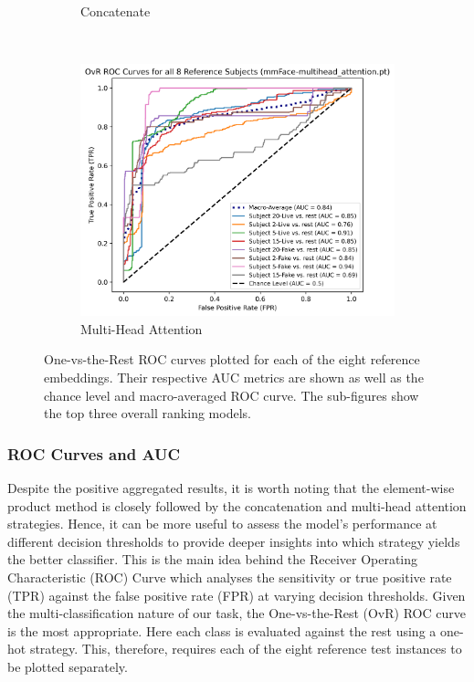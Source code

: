 \documentclass{mpaper}
\begin{document}
\begin{figure}[t!]
\begin{subfigure}[b]{0.315\textwidth}
        \caption{Concatenate}
        \label{fig:roc_concatenate}
    \end{subfigure}
    ~\hspace{0.001cm}
    \begin{subfigure}[b]{0.325\textwidth}
        \includegraphics[width=1.09\textwidth]{figures/roc_multihead_attention.png}
        \caption{Multi-Head Attention}
        \label{fig:roc_multihead_attention}
    \end{subfigure}
    \vspace{0.1cm}
    \caption{One-vs-the-Rest ROC curves plotted for each of the eight reference embeddings. Their respective AUC metrics are shown as well as the chance level and macro-averaged ROC curve. The sub-figures show the top three overall ranking models.}
    \vspace{-0.35cm}
\end{figure}

\subsubsection{ROC Curves and AUC}
Despite the positive aggregated results, it is worth noting that the element-wise product method is closely followed by the concatenation and multi-head attention strategies. Hence, it can be more useful to assess the model's performance at different decision thresholds to provide deeper insights into which strategy yields the better classifier. This is the main idea behind the Receiver Operating Characteristic (ROC) Curve which analyses the sensitivity or true positive rate (TPR) against the false positive rate (FPR) at varying decision thresholds. Given the multi-classification nature of our task, the One-vs-the-Rest (OvR) ROC curve is the most appropriate. Here each class is evaluated against the rest using a one-hot strategy. This, therefore, requires each of the eight reference test instances to be plotted separately.
\end{document}
